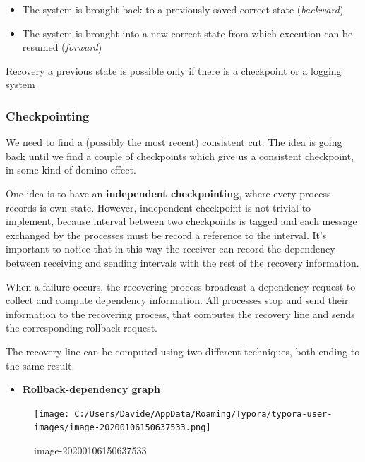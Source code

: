 \begin{itemize}
\itemsep1pt\parskip0pt
\item
  The system is brought back to a previously saved correct state
  (\emph{backward})
\item
  The system is brought into a new correct state from which execution
  can be resumed (\emph{forward})
\end{itemize}

Recovery a previous state is possible only if there is a checkpoint or a
logging system

\subsubsection{Checkpointing}\label{checkpointing}

We need to find a (possibly the most recent) consistent cut. The idea is
going back until we find a couple of checkpoints which give us a
consistent checkpoint, in some kind of domino effect.

One idea is to have an \textbf{independent checkpointing}, where every
process records is own state. However, independent checkpoint is not
trivial to implement, because interval between two checkpoints is tagged
and each message exchanged by the processes must be record a reference
to the interval. It's important to notice that in this way the receiver
can record the dependency between receiving and sending intervals with
the rest of the recovery information.

When a failure occurs, the recovering process broadcast a dependency
request to collect and compute dependency information. All processes
stop and send their information to the recovering process, that computes
the recovery line and sends the corresponding rollback request.

The recovery line can be computed using two different techniques, both
ending to the same result.

\begin{itemize}
\itemsep1pt\parskip0pt
\item
  \textbf{Rollback-dependency graph}
\end{itemize}

\begin{figure}[htbp]
\centering
\texttt{[image: C:/Users/Davide/AppData/Roaming/Typora/typora-user-images/image-20200106150637533.png]}
\caption{image-20200106150637533}
\end{figure}

